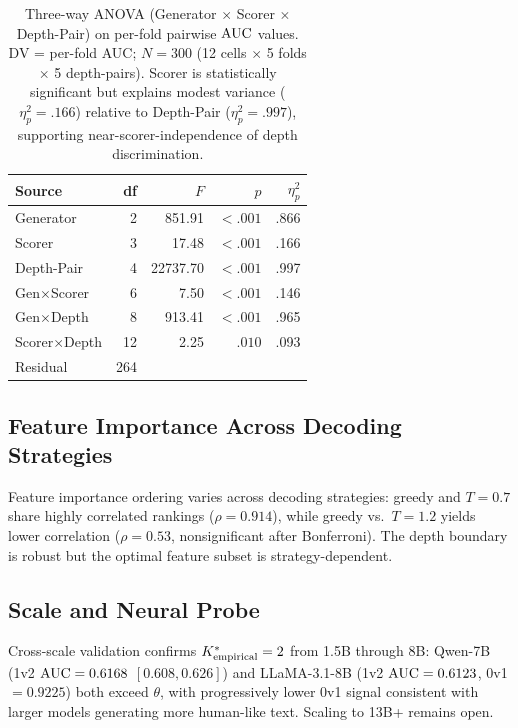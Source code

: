 \begin{table}[h]
\centering
\small
\caption{Three-way ANOVA (Generator $\times$ Scorer $\times$ Depth-Pair) on per-fold pairwise $\text{AUC}$ values. DV = per-fold AUC; $N{=}300$ (12 cells $\times$ 5 folds $\times$ 5 depth-pairs). Scorer is statistically significant but explains modest variance ($\eta^2_p{=}.166$) relative to Depth-Pair ($\eta^2_p{=}.997$), supporting near-scorer-independence of depth discrimination.}
\label{tab:anova_crossscorer}
\begin{tabular}{lrrrr}
\toprule
\textbf{Source} & \textbf{df} & $F$ & $p$ & $\eta^2_p$ \\
\midrule
Generator     & 2  & 851.91  & ${<}.001$  & .866 \\
Scorer        & 3  & 17.48  & ${<}.001$  & .166 \\
Depth-Pair    & 4  & 22737.70  & ${<}.001$  & .997 \\
Gen$\times$Scorer & 6 & 7.50 & ${<}.001$ & .146 \\
Gen$\times$Depth  & 8 & 913.41 & ${<}.001$ & .965 \\
Scorer$\times$Depth & 12 & 2.25 & $.010$ & .093 \\
Residual      & 264 & & & \\
\bottomrule
\end{tabular}
\end{table}

\subsection{Feature Importance Across Decoding Strategies}

Feature importance ordering varies across decoding strategies: greedy and $T{=}0.7$ share highly correlated rankings ($\rho = 0.914$), while greedy vs.\ $T{=}1.2$ yields lower correlation ($\rho = 0.53$, nonsignificant after Bonferroni).
The depth boundary is robust but the optimal feature subset is strategy-dependent.

\subsection{Scale and Neural Probe}
\label{sec:extended_neural_probe}

Cross-scale validation confirms ${K^*_{\text{empirical}}} = 2$ from 1.5B through 8B: Qwen-7B (1v2 $\text{AUC} = 0.6168$ $[0.608, 0.626]$) and LLaMA-3.1-8B (1v2 $\text{AUC} = 0.6123$, 0v1 $= 0.9225$) both exceed $\theta$, with progressively lower 0v1 signal consistent with larger models generating more human-like text. Scaling to 13B+ remains open.

